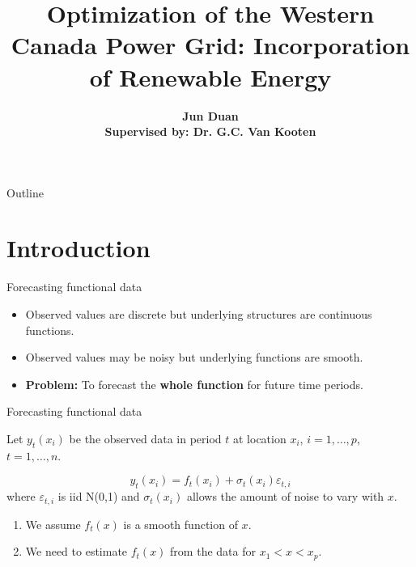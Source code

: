 \documentclass[13pt,xcolor=dvipsnames]{beamer}
\title[Incorporation of Renewable Energy]{Optimization of the Western Canada Power Grid:
Incorporation of Renewable Energy}
\author[Jun Duan]{\textbf {Jun Duan  \\
\footnotesize Supervised by: Dr. G.C. Van Kooten }}
\institute[UVic]{University of Victoria}
\begin{document}
\begin{frame}
\titlepage
\end{frame}

\begin{frame}{Outline}
\tableofcontents
\end{frame}

\section{Introduction}

\begin{frame}{Forecasting functional data}
\begin{itemize}[<+-| alert@+>]
\item Observed values are discrete but underlying structures are continuous functions.
\item Observed values may be noisy but underlying functions are smooth.
\item \textbf{Problem:} To forecast the \textbf{whole function} for future time periods.
\end{itemize}
\end{frame}

\begin{frame}{Forecasting functional data}

Let $y_t(x_i)$ be the observed data in period $t$ at location $x_i$, $i=1,\dots,p$, $t=1,\dots,n$.
\pause

\begin{block}{}
$$y_t(x_i) = f_t(x_i) + \sigma_t(x_i)\varepsilon_{t,i}$$
where $\varepsilon_{t,i}$ is iid N(0,1) and $\sigma_t(x_i)$ allows the amount of noise to vary with $x$.
\end{block}
\pause

\begin{enumerate}[<+-| alert@+>]
\item We assume $f_t(x)$ is a smooth function of $x$.
\item We need to estimate $f_t(x)$ from the data for $x_1 < x < x_p$.
\end{enumerate}
\end{frame}
\end{document}
